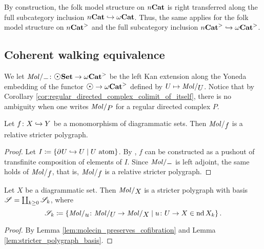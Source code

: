 \begin{rmk}\label{rmk:also_right_transferred_n_folk}
    By construction, the folk model structure on \( {n\mathbf{Cat}} \) is right transferred along the full subcategory inclusion \( {n\mathbf{Cat}} \hookrightarrow {\omega\mathbf{Cat}} \).
    Thus, the same applies for the folk model structure on \( {n\mathbf{Cat}}^> \) and the full subcategory inclusion \( {n\mathbf{Cat}}^> \hookrightarrow {\omega\mathbf{Cat}}^> \).
\end{rmk}

\subsection{Coherent walking equivalence}

We let \( \molecin{-} \colon \dgmSet \to \somegaCat \) be the left Kan extension along the Yoneda embedding of the functor \( \atom \to \somegaCat \) defined by \( U \mapsto \molecin{U} \).
Notice that by Corollary \ref{cor:regular_directed_complex_colimit_of_itself}, there is no ambiguity when one writes \( \molecin{P} \) for a regular directed complex \( P \).

\begin{lem} \label{lem:molecin_preserves_cofibration}
    Let \( f \colon X \hookrightarrow Y \) be a monomorphism of diagrammatic sets.
    Then \( \molecin{f} \) is a relative stricter polygraph.
\end{lem}
\begin{proof}
    Let \( I \coloneqq \left\{ {\partial_{}^{} U \hookrightarrow U \mid U \text{ atom}} \right\} \).
    By \cite[Remark 2.9]{chanavat2024htpy}, \( f \) can be constructed as a pushout of transfinite composition of elements of \( I \).
    Since \( \molecin{-} \) is left adjoint, the same holds of \( \molecin{f} \), that is, \( \molecin{f} \) is a relative stricter polygraph.
\end{proof}

\begin{cor} \label{cor:molecin_polygraph_with_basis}
    Let \( X \) be a diagrammatic set. 
    Then \( \molecin{X} \) is a stricter polygraph with basis \( \mathscr{S} = \coprod_{k \geq 0} \mathscr{S}_k \), where
    \begin{equation*}
        \cls{S}_k \eqdef \set{\molecin{u} \colon \molecin{U} \to \molecin{X} \mid u \colon U \to X \in \gr{k}{\nd X}}.
    \end{equation*}
\end{cor}
\begin{proof}
    By Lemma \ref{lem:molecin_preserves_cofibration} and Lemma \ref{lem:stricter_polygraph_basis}.
\end{proof}

